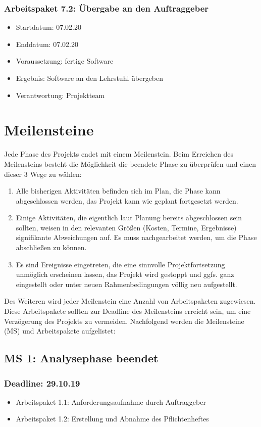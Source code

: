 \subsubsection*{Arbeitspaket 7.2: Übergabe an den Auftraggeber}
\begin{itemize}
\item Startdatum: 07.02.20
\item Enddatum: 07.02.20
\item Voraussetzung: fertige Software
\item Ergebnis: Software an den Lehrstuhl übergeben
\item Verantwortung: Projektteam
\end{itemize}

\section*{Meilensteine}
Jede Phase des Projekts endet mit einem Meilenstein. Beim Erreichen des Meilensteins besteht die Möglichkeit die beendete Phase zu überprüfen und einen dieser 3 Wege zu wählen: 

\begin{enumerate}
\item Alle bisherigen Aktivitäten befinden sich im Plan, die Phase kann abgeschlossen werden, das Projekt kann wie geplant fortgesetzt werden.
\item Einige Aktivitäten, die eigentlich laut Planung bereits abgeschlossen sein sollten, weisen in den relevanten Größen (Kosten, Termine, Ergebnisse) signifikante Abweichungen auf. Es muss nachgearbeitet werden, um die Phase abschließen zu können.
\item Es sind Ereignisse eingetreten, die eine sinnvolle Projektfortsetzung unmöglich erscheinen lassen, das Projekt wird gestoppt und ggfs. ganz eingestellt oder unter neuen Rahmenbedingungen völlig neu aufgestellt.
\end{enumerate}

Des Weiteren wird jeder Meilenstein eine Anzahl von Arbeitspaketen zugewiesen. Diese Arbeitspakete sollten zur Deadline des Meilensteins erreicht sein, um eine Verzögerung des Projekts zu vermeiden. Nachfolgend werden die Meilensteine (MS) und Arbeitspakete aufgelistet:

\subsection*{MS 1: Analysephase beendet}
\subsubsection*{Deadline: 29.10.19}
\begin{itemize}
\item Arbeitspaket 1.1: Anforderungsaufnahme durch Auftraggeber
\item Arbeitspaket 1.2: Erstellung und Abnahme des Pflichtenheftes
\end{itemize}

